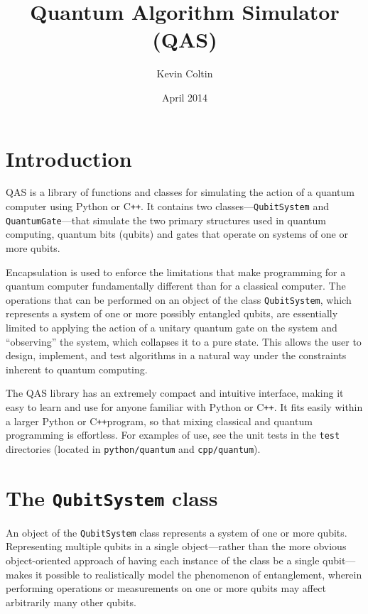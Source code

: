 \documentclass{article}
\title{Quantum Algorithm Simulator (QAS)}
\author{Kevin Coltin}
\date{April 2014}
\newcommand{\cpp}{C{}\texttt{++}}
\begin{document}
 

\maketitle 

\tableofcontents

\section{Introduction} 

QAS is a library of functions and classes for simulating the action of a quantum computer using Python or \cpp. It contains two classes---\verb~QubitSystem~ and \verb~QuantumGate~---that simulate the two primary structures used in quantum computing, quantum bits (qubits) and gates that operate on systems of one or more qubits. 

Encapsulation is used to enforce the limitations that make programming for a quantum computer fundamentally different than for a classical computer. The operations that can be performed on an object of the class \verb~QubitSystem~, which represents a system of one or more possibly entangled qubits, are essentially limited to applying the action of a unitary quantum gate on the system and ``observing'' the system, which collapses it to a pure state. This allows the user to design, implement, and test algorithms in a natural way under the constraints inherent to quantum computing. 

The QAS library has an extremely compact and intuitive interface, making it easy to learn and use for anyone familiar with Python or \cpp. It fits easily within a larger Python or \cpp program, so that mixing classical and quantum programming is effortless. For examples of use, see the unit tests in the \verb~test~ directories (located in \verb~python/quantum~ and \verb~cpp/quantum~). 


\section{The \texttt{QubitSystem} class}

An object of the \verb~QubitSystem~ class represents a system of one or more qubits. Representing multiple qubits in a single object---rather than the more obvious object-oriented approach of having each instance of the class be a single qubit---makes it possible to realistically model the phenomenon of entanglement, wherein performing operations or measurements on one or more qubits may affect arbitrarily many other qubits. 
\end{document}
